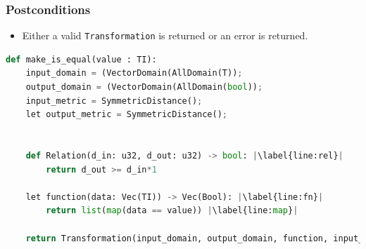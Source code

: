 \documentclass[11pt,a4paper]{article}
\newcommand{\grace}[1]{{ {\color{purple}{(grace)~#1}}}}
\begin{document}
\subsubsection*{Postconditions}

\begin{itemize}
    \item Either a valid \texttt{Transformation} is returned or an error is returned.
\end{itemize}

\begin{lstlisting}[language=Python, escapechar=|]
def make_is_equal(value : TI):
    input_domain = (VectorDomain(AllDomain(T));
    output_domain = (VectorDomain(AllDomain(bool));
    input_metric = SymmetricDistance(); 
    let output_metric = SymmetricDistance();
    
    
    def Relation(d_in: u32, d_out: u32) -> bool: |\label{line:rel}|
        return d_out >= d_in*1
        
    let function(data: Vec(TI)) -> Vec(Bool): |\label{line:fn}|
        return list(map(data == value)) |\label{line:map}|

    return Transformation(input_domain, output_domain, function, input_metric, output_metric, Relation)
\end{lstlisting}

\grace{ Need to rewrite pseudocode for the next round of edits. Need to confirm whether we return Transformation or make row by row function (might be confusing if it's referencing another function? Also need to check if the mapping works for vectors instead of elements. }
\end{document}
